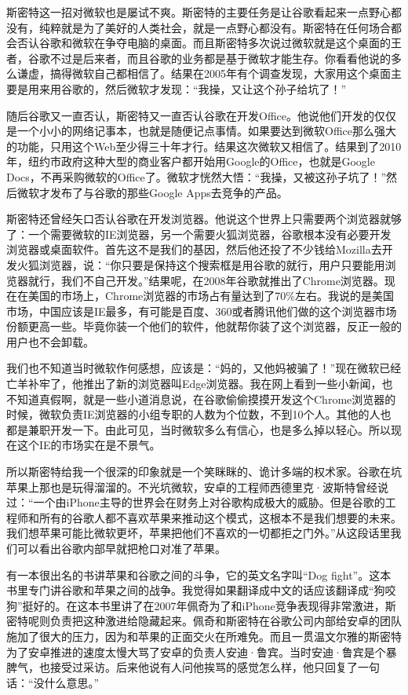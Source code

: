 \documentclass[
  letterpaper,
  DIV=11,
  numbers=noendperiod]{scrreprt}
\begin{document}
斯密特这一招对微软也是屡试不爽。斯密特的主要任务是让谷歌看起来一点野心都没有，纯粹就是为了美好的人类社会，就是一点野心都没有。斯密特在任何场合都会否认谷歌和微软在争夺电脑的桌面。而且斯密特多次说过微软就是这个桌面的王者，谷歌不过是后来者，而且谷歌的业务都是基于微软才能生存。你看看他说的多么谦虚，搞得微软自己都相信了。结果在2005年有个调查发现，大家用这个桌面主要是用来用谷歌的，然后微软才发现：``我操，又让这个孙子给坑了！''

随后谷歌又一直否认，斯密特又一直否认谷歌在开发Office。他说他们开发的仅仅是一个小小的网络记事本，也就是随便记点事情。如果要达到微软Office那么强大的功能，只用这个Web至少得三十年才行。结果这次微软又相信了。结果到了2010年，纽约市政府这种大型的商业客户都开始用Google的Office，也就是Google
Docs，不再采购微软的Office了。微软才恍然大悟：``我操，又被这孙子坑了！''然后微软才发布了与谷歌的那些Google
Apps去竞争的产品。

斯密特还曾经矢口否认谷歌在开发浏览器。他说这个世界上只需要两个浏览器就够了：一个需要微软的IE浏览器，另一个需要火狐浏览器，谷歌根本没有必要开发浏览器或桌面软件。首先这不是我们的基因，然后他还投了不少钱给Mozilla去开发火狐浏览器，说：``你只要是保持这个搜索框是用谷歌的就行，用户只要能用浏览器就行，我们不自己开发。''结果呢，在2008年谷歌就推出了Chrome浏览器。现在在美国的市场上，Chrome浏览器的市场占有量达到了70\%左右。我说的是美国市场，中国应该是IE最多，有可能是百度、360或者腾讯他们做的这个浏览器市场份额更高一些。毕竟你装一个他们的软件，他就帮你装了这个浏览器，反正一般的用户也不会卸载。

我们也不知道当时微软作何感想，应该是：``妈的，又他妈被骗了！''现在微软已经亡羊补牢了，他推出了新的浏览器叫Edge浏览器。我在网上看到一些小新闻，也不知道真假啊，就是一些小道消息说，在谷歌偷偷摸摸开发这个Chrome浏览器的时候，微软负责IE浏览器的小组专职的人数为个位数，不到10个人。其他的人也都是兼职开发一下。由此可见，当时微软多么有信心，也是多么掉以轻心。所以现在这个IE的市场实在是不景气。

所以斯密特给我一个很深的印象就是一个笑眯眯的、诡计多端的权术家。谷歌在坑苹果上那也是玩得溜溜的。不光坑微软，安卓的工程师西德里克·波斯特曾经说过：``一个由iPhone主导的世界会在财务上对谷歌构成极大的威胁。但是谷歌的工程师和所有的谷歌人都不喜欢苹果来推动这个模式，这根本不是我们想要的未来。我们想苹果可能比微软更坏，苹果把他们不喜欢的一切都拒之门外。''从这段话里我们可以看出谷歌内部早就把枪口对准了苹果。

有一本很出名的书讲苹果和谷歌之间的斗争，它的英文名字叫``Dog
fight''。这本书里专门讲谷歌和苹果之间的战争。我觉得如果翻译成中文的话应该翻译成``狗咬狗''挺好的。在这本书里讲了在2007年佩奇为了和iPhone竞争表现得非常激进，斯密特呢则负责把这种激进给隐藏起来。佩奇和斯密特在谷歌公司内部给安卓的团队施加了很大的压力，因为和苹果的正面交火在所难免。而且一贯温文尔雅的斯密特为了安卓推进的速度太慢大骂了安卓的负责人安迪·鲁宾。当时安迪·鲁宾是个暴脾气，也接受过采访。后来他说有人问他挨骂的感觉怎么样，他只回复了一句话：``没什么意思。''
\end{document}
